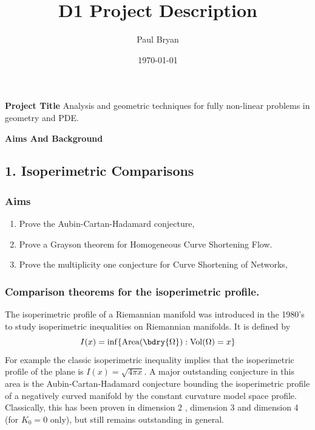 \documentclass[12pt]{amsart}
\date{}
\author{Paul Bryan}
\date{\today}
\title{D1 Project Description}
\begin{document}
\maketitle


\smallskip\noindent\textbf{Project Title}
\label{sec-1}
Analysis and geometric techniques for fully non-linear problems in geometry and PDE.

\smallskip\noindent\textbf{Aims And Background}
\label{sec-2}

\subsection*{1. Isoperimetric Comparisons}
\label{sec-2-1}

\subsubsection*{Aims}
\label{sec-2-1-1}

\begin{enumerate}
\item Prove the Aubin-Cartan-Hadamard conjecture,
\item Prove a Grayson theorem for Homogeneous Curve Shortening Flow.
\item Prove the multiplicity one conjecture for Curve Shortening of Networks,
\end{enumerate}

\subsubsection*{Comparison theorems for the isoperimetric profile.}
\label{sec-2-1-2}

The isoperimetric profile of a Riemannian manifold was introduced in the 1980's \cite{MR875084,MR999971} to study isoperimetric inequalities on Riemannian manifolds. It is defined by
\[
I(x) = \inf\{\operatorname{Area} (\bdry{\Omega}) : \operatorname{Vol}(\Omega) = x\}
\]
For example the classic isoperimetric inequality implies that the isoperimetric profile of the plane is $I(x) = \sqrt{4\pi x}$. A major outstanding conjecture in this area is the Aubin-Cartan-Hadamard conjecture \cite{MR0448404, MR936419} bounding the isoperimetric profile of a negatively curved manifold by the constant curvature model space profile. Classically, this has been proven in dimension 2 \cite{zbMATH02588223}, dimension 3 \cite{MR1156385,MR2167269} and dimension 4 \cite{MR608287} (for $K_0 = 0$ only), but still remains outstanding in general.
\end{document}
